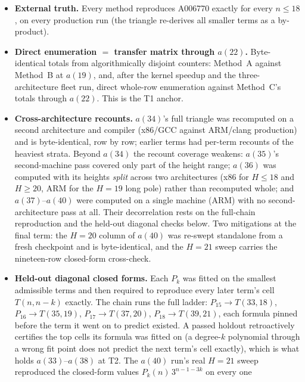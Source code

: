 \documentclass[11pt]{article}
\newcommand{\tierone}{\textsf{T1}}
\newcommand{\tiertwo}{\textsf{T2}}
\begin{document}
\begin{itemize}
  \item \textbf{External truth.} Every method reproduces A006770 exactly for
        every $n\le18$, on every production run (the triangle re-derives all
        smaller terms as a by-product).
  \item \textbf{Direct enumeration $=$ transfer matrix through $a(22)$.}
        Byte-identical totals from algorithmically disjoint counters: Method~A
        against Method~B at $a(19)$, and, after the kernel speedup and the
        three-architecture fleet run, direct whole-row enumeration against
        Method~C's totals through $a(22)$. This is the \tierone{} anchor.
  \item \textbf{Cross-architecture recounts.} $a(34)$'s full triangle was
        recomputed on a second architecture and compiler (x86/GCC against
        ARM/clang production) and is byte-identical, row by row; earlier
        terms had per-term recounts of the heaviest strata. Beyond $a(34)$
        the recount coverage weakens: $a(35)$'s second-machine
        pass covered only part of the height range; $a(36)$ was computed
        with its heights \emph{split} across two architectures (x86 for
        $H\le18$ and $H\ge20$, ARM for the $H=19$ long pole) rather than
        recomputed whole; and $a(37)$--$a(40)$ were computed on a single
        machine (ARM) with no second-architecture pass at all. Their
        decorrelation rests on the full-chain reproduction and the held-out
        diagonal checks below. Two mitigations at the final term: the
        $H=20$ column of $a(40)$ was re-swept standalone from a fresh
        checkpoint and is byte-identical, and the $H=21$ sweep carries the
        nineteen-row closed-form cross-check.
  \item \textbf{Held-out diagonal closed forms.} Each $P_k$ was fitted on
        the smallest admissible terms and then required to reproduce every
        later term's cell $T(n,n-k)$ exactly. The chain runs the full
        ladder: $P_{15}\to T(33,18)$, $P_{16}\to T(35,19)$,
        $P_{17}\to T(37,20)$, $P_{18}\to T(39,21)$, each formula pinned
        before the term it went on to predict existed. A passed holdout
        retroactively certifies the top cells its formula was fitted on (a
        degree-$k$ polynomial through a wrong fit point does not predict
        the next term's cell exactly), which is what holds
        $a(33)$--$a(38)$ at \tiertwo{}. The $a(40)$ run's real $H=21$ sweep
        reproduced the closed-form values $P_k(n)\,3^{n-1-3k}$ on every one

\end{itemize}
\end{document}
